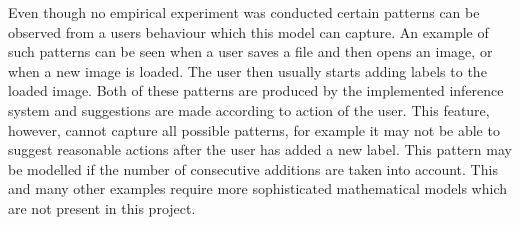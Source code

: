 Even though no empirical experiment was conducted certain patterns can be observed from a users behaviour which this model can capture. An example of such patterns can be seen when a user saves a file and then opens an image, or when a new image is loaded.  The user then usually starts adding labels to the loaded image. Both of these patterns are produced by the implemented inference system and suggestions are made according to action of the user.
This feature, however, cannot capture all possible patterns, for example it may not be able to suggest reasonable actions after the user has added a new label. This pattern may be modelled if the number of consecutive additions are taken into account. This and many other examples require more sophisticated mathematical models which are not present in this project.

